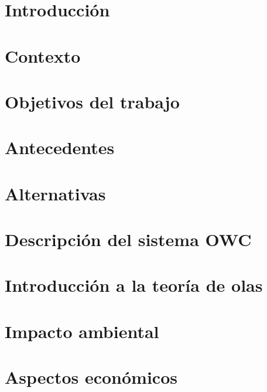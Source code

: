 \label{ch:memoria}


\section{Introducción}\label{sec:intro}
\section{Contexto}\label{sec:contexto}
\section{Objetivos del trabajo}\label{sec:objetivos}
\section{Antecedentes}\label{sec:antecedentes}
\section{Alternativas}\label{sec:alternativas}
\section{Descripción del sistema OWC}\label{sec:descripcionOWC}
\section{Introducción a la teoría de olas}\label{sec:teoriaolas}
\section{Impacto ambiental}\label{sec:impactoambiental}
\section{Aspectos económicos}\label{sec:aspectoseconomicos}
